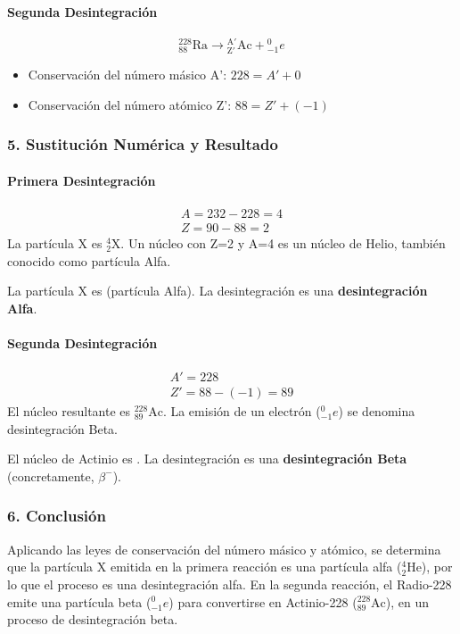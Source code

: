 \paragraph*{Segunda Desintegración}
$$ {}_{88}^{228}\text{Ra} \rightarrow {}_{\text{Z}'}^{\text{A}'}\text{Ac} + {}_{-1}^{0}e $$
\begin{itemize}
    \item Conservación del número másico A': $228 = A' + 0$
    \item Conservación del número atómico Z': $88 = Z' + (-1)$
\end{itemize}

\subsubsection*{5. Sustitución Numérica y Resultado}
\paragraph*{Primera Desintegración}
\begin{gather}
    A = 232 - 228 = 4 \\
    Z = 90 - 88 = 2
\end{gather}
La partícula X es ${}_{2}^{4}\text{X}$. Un núcleo con Z=2 y A=4 es un núcleo de Helio, también conocido como partícula Alfa.
\begin{cajaresultado}
    La partícula X es  (partícula Alfa). La desintegración es una \textbf{desintegración Alfa}.
\end{cajaresultado}

\paragraph*{Segunda Desintegración}
\begin{gather}
    A' = 228 \\
    Z' = 88 - (-1) = 89
\end{gather}
El núcleo resultante es ${}_{89}^{228}\text{Ac}$. La emisión de un electrón ($_{-1}^{0}e$) se denomina desintegración Beta.
\begin{cajaresultado}
    El núcleo de Actinio es . La desintegración es una \textbf{desintegración Beta} (concretamente, $\beta^-$).
\end{cajaresultado}

\subsubsection*{6. Conclusión}
\begin{cajaconclusion}
Aplicando las leyes de conservación del número másico y atómico, se determina que la partícula X emitida en la primera reacción es una partícula alfa (${}_{2}^{4}\text{He}$), por lo que el proceso es una desintegración alfa. En la segunda reacción, el Radio-228 emite una partícula beta ($_{-1}^{0}e$) para convertirse en Actinio-228 (${}_{89}^{228}\text{Ac}$), en un proceso de desintegración beta.
\end{cajaconclusion}

